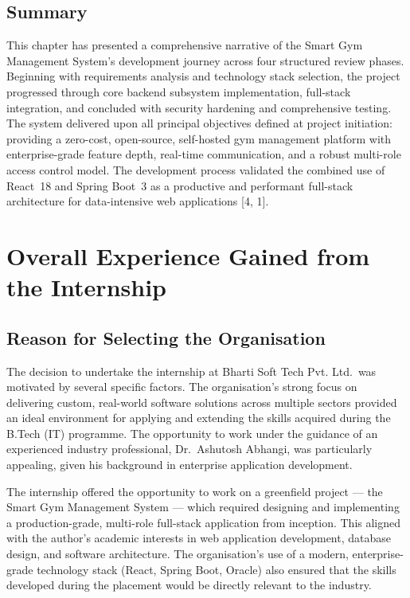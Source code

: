 \documentclass[
  12pt,
  a4paperpaper,
]{report}
\begin{document}
\section*{Summary}\label{lit-summary}

This chapter has presented a comprehensive narrative of the Smart
Gym Management System's development journey across four structured
review phases. Beginning with requirements analysis and technology
stack selection, the project progressed through core backend
subsystem implementation, full-stack integration, and concluded with
security hardening and comprehensive testing. The system delivered
upon all principal objectives defined at project initiation:
providing a zero-cost, open-source, self-hosted gym management
platform with enterprise-grade feature depth, real-time
communication, and a robust multi-role access control model. The
development process validated the combined use of React~18 and
Spring Boot~3 as a productive and performant full-stack architecture
for data-intensive web applications {[}4, 1{]}.



\chapter{Overall Experience Gained from the
Internship}\label{overall-experience-gained-from-the-internship}


\section{Reason for Selecting the
Organisation}\label{reason-for-selecting-the-organisation}

The decision to undertake the internship at Bharti Soft Tech Pvt.
Ltd.~was motivated by several specific factors. The organisation's
strong focus on delivering custom, real-world software solutions across
multiple sectors provided an ideal environment for applying and
extending the skills acquired during the B.Tech (IT) programme. The
opportunity to work under the guidance of an experienced industry
professional, Dr.~Ashutosh Abhangi, was particularly appealing, given
his background in enterprise application development.

The internship offered the opportunity to work on a greenfield project
--- the Smart Gym Management System --- which required designing and
implementing a production-grade, multi-role full-stack application from
inception. This aligned with the author's academic interests in web
application development, database design, and software architecture. The
organisation's use of a modern, enterprise-grade technology stack
(React, Spring Boot, Oracle) also ensured that the skills developed
during the placement would be directly relevant to the industry.
\end{document}
